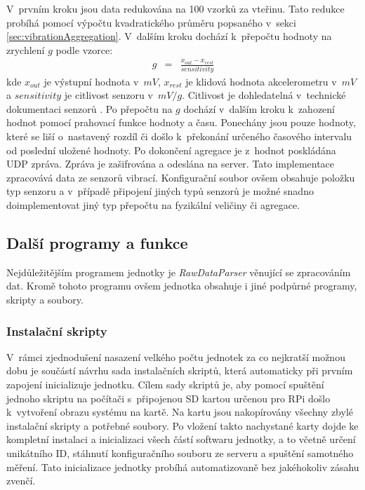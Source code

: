 V~prvním kroku jsou data redukována na 100 vzorků za vteřinu. Tato redukce probíhá pomocí výpočtu kvadratického průměru popsaného v~sekci \ref{sec:vibrationAggregation}. V~dalším kroku dochází k~přepočtu hodnoty na zrychlení $g$ podle vzorce:
\begin{eqnarray}\label{eq:gravity}
  g & = & \frac{x_{out} - x_{rest}}{sensitivity}
\end{eqnarray}
kde $x_{out}$ je výstupní hodnota v~$mV$, $x_{rest}$ je klidová hodnota akcelerometru v~$mV$ a $sensitivity$ je citlivost senzoru v~$mV/g$. Citlivost je dohledatelná v~technické dokumentaci senzorů \cite{accelerationEq}. Po přepočtu na $g$ dochází v~dalším kroku k~zahození hodnot pomocí prahovací funkce hodnoty a času. Ponechány jsou pouze hodnoty, které se liší o~nastavený rozdíl či došlo k~překonání určeného časového intervalu od poslední uložené hodnoty. Po dokončení agregace je z~hodnot poskládána UDP zpráva. Zpráva je zašifrována a odeslána na server. Tato implementace zpracovává data ze senzorů vibrací. Konfigurační soubor ovšem obsahuje položku typ senzoru a v~případě připojení jiných typů senzorů je možné snadno doimplementovat jiný typ přepočtu na fyzikální veličiny či agregace.



\subsection{Další programy a funkce}
Nejdůležitějším programem jednotky je \textit{RawDataParser} věnující se zpracováním dat. Kromě tohoto programu ovšem jednotka obsahuje i jiné podpůrné programy, skripty a soubory.

\subsubsection*{Instalační skripty}
V~rámci zjednodušení nasazení velkého počtu jednotek za co nejkratší možnou dobu je součástí návrhu sada instalačních skriptů, která automaticky při prvním zapojení inicializuje jednotku. Cílem sady skriptů je, aby pomocí spuštění jednoho skriptu na počítači s~připojenou SD kartou určenou pro RPi došlo k~vytvoření obrazu systému na kartě. Na kartu jsou nakopírovány všechny zbylé instalační skripty a potřebné soubory. Po vložení takto nachystané karty dojde ke kompletní instalaci a inicializaci všech částí softwaru jednotky, a to včetně určení unikátního ID, stáhnutí konfiguračního souboru ze serveru a spuštění samotného měření. Tato inicializace jednotky probíhá automatizovaně bez jakéhokoliv zásahu zvenčí.

